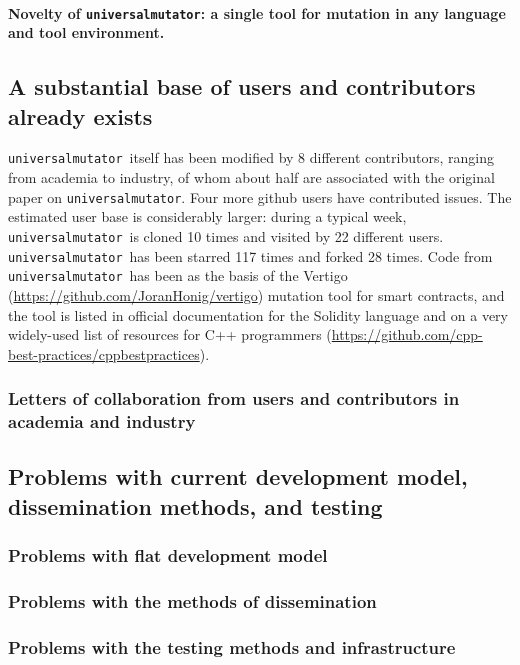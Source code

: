 \documentclass[numbers]{proposalnsf}
\newcommand{\um}{\texttt{universalmutator}}
\begin{document}
\paragraph{Novelty of \um: a single tool for mutation in any language and tool environment.}



\subsection{A substantial base of users and contributors already exists}

\um\ itself has been modified by 8 different contributors, ranging from academia to industry, of whom about half are associated with the original paper on \um.  Four more github users have contributed issues.  The estimated user base is considerably larger:  during a typical week, \um\ is cloned 10 times and visited by 22 different users.  \um\ has been starred 117 times and forked 28 times.  Code from \um\ has been as the basis of the Vertigo (\url{https://github.com/JoranHonig/vertigo}) mutation tool for smart contracts, and the tool is listed in official documentation for the Solidity language and on a very widely-used list of resources for C++ programmers (\url{https://github.com/cpp-best-practices/cppbestpractices}).

\subsubsection{Letters of collaboration from users and contributors in academia and industry}


\subsection{Problems with current development model, dissemination methods, and testing}

\subsubsection{Problems with flat development model}

\subsubsection{Problems with the methods of dissemination}

\subsubsection{Problems with the testing methods and infrastructure}
\end{document}
